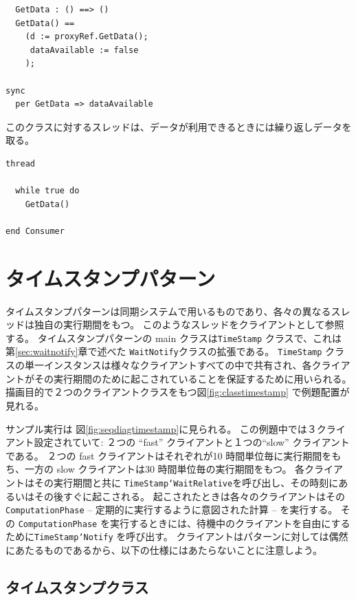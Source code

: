 \documentclass[\pformat,12pt]{jreport}
\begin{document}
\begin{lstlisting}
  GetData : () ==> ()
  GetData() ==
    (d := proxyRef.GetData();
     dataAvailable := false
    );

sync
  per GetData => dataAvailable
\end{lstlisting}

このクラスに対するスレッドは、データが利用できるときには繰り返しデータを取る。

\begin{lstlisting}
thread

  while true do
    GetData()

end Consumer
\end{lstlisting}

\section{タイムスタンプパターン}\label{sec:TimeStamp}

タイムスタンプパターンは同期システムで用いるものであり、各々の異なるスレッドは独自の実行期間をもつ。
このようなスレッドをクライアントとして参照する。
タイムスタンプパターンの main クラスは\texttt{TimeStamp} クラスで、これは 第\ref{sec:waitnotify}章で述べた \texttt{WaitNotify}クラスの拡張である。
\texttt{TimeStamp} クラスの単一インスタンスは様々なクライアントすべての中で共有され、各クライアントがその実行期間のために起こされていることを保証するために用いられる。
描画目的で２つのクライアントクラスをもつ図\ref{fig:classtimestamp} で例題配置が見れる。

サンプル実行は 図\ref{fig:seqdiagtimestamp}に見られる。 
この例題中では３クライアント設定されていて: ２つの ``fast'' クライアントと１つの``slow'' クライアントである。
２つの fast クライアントはそれぞれが10 時間単位毎に実行期間をもち、一方の slow クライアントは30 時間単位毎の実行期間をもつ。
各クライアントはその実行期間と共に \texttt{TimeStamp`WaitRelative}を呼び出し、その時刻にあるいはその後すぐに起こされる。
起こされたときは各々のクライアントはその\texttt{ComputationPhase} -- 定期的に実行するように意図された計算 -- を実行する。
その \texttt{ComputationPhase} を実行するときには、待機中のクライアントを自由にするために\texttt{TimeStamp`Notify} を呼び出す。
クライアントはパターンに対しては偶然にあたるものであるから、以下の仕様にはあたらないことに注意しよう。

\subsection{タイムスタンプクラス}
\end{document}

